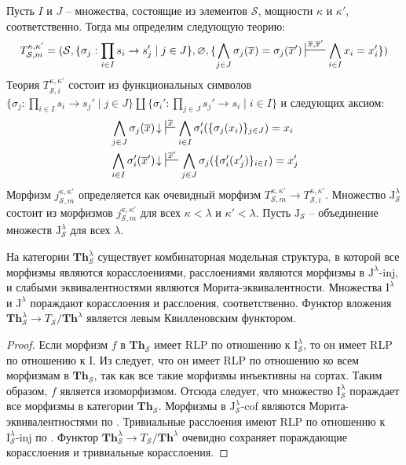 \documentclass[reqno]{amsart}
\theoremstyle{definition}
\theoremstyle{remark}
\newcommand{\bcat}[1]{\mathbf{#1}}
\newcommand{\Th}{\bcat{Th}}
\newcommand{\I}{\mathrm{I}}
\newcommand{\J}{\mathrm{J}}
\newcommand{\class}[2]{#1\text{-}\mathrm{#2}}
\newcommand{\Iinj}[1][\I]{\class{#1}{inj}}
\newcommand{\Icof}[1][\I]{\class{#1}{cof}}
\begin{document}
Пусть $I$ и $J$ -- множества, состоящие из элементов $\mathcal{S}$, мощности $\kappa$ и $\kappa'$, соответственно.
Тогда мы определим следующую теорию:
\[ T_{\mathcal{S},m}^{\kappa,\kappa'} = (\mathcal{S}, \{ \sigma_j : \prod_{i \in I} s_i \to s_j' \mid j \in J \}, \varnothing, \{ \bigwedge_{j \in J} \sigma_j(\overline{x}) = \sigma_j(\overline{x}') \sststile{}{\overline{x},\overline{x}'} \bigwedge_{i \in I} x_i = x_i' \}) \]
Теория $T_{\mathcal{S},i}^{\kappa,\kappa'}$ состоит из функциональных символов $\{ \sigma_j : \prod_{i \in I} s_i \to s_j' \mid j \in J \} \amalg \{ \sigma_i' : \prod_{j \in J} s_j' \to s_i \mid i \in I \}$ и следующих аксиом:
\begin{align*}
& \bigwedge_{j \in J} \sigma_j(\overline{x})\!\downarrow\ \sststile{}{\overline{x}} \bigwedge_{i \in I} \sigma_i'(\{ \sigma_j(x_i) \}_{j \in J}) = x_i \\
& \bigwedge_{i \in I} \sigma_i'(\overline{x}')\!\downarrow\ \sststile{}{\overline{x}'} \bigwedge_{j \in J} \sigma_j(\{ \sigma_i'(x_j') \}_{i \in I}) = x_j'
\end{align*}
Морфизм $j_{\mathcal{S},m}^{\kappa,\kappa'}$ определяется как очевидный морфизм $T_{\mathcal{S},m}^{\kappa,\kappa'} \to T_{\mathcal{S},i}^{\kappa,\kappa'}$.
Множество $\J_\mathcal{S}^\lambda$ состоит из морфизмов $j_{\mathcal{S},m}^{\kappa,\kappa'}$ для всех $\kappa < \lambda$ и $\kappa' < \lambda$.
Пусть $\J_\mathcal{S}$ -- объединение множеств $\J_\mathcal{S}^\lambda$ для всех $\lambda$.

\begin{prop}
На категории $\Th^\lambda_\mathcal{S}$ существует комбинаторная модельная структура, в которой все морфизмы являются корасслоениями, расслоениями являются морфизмы в $\Iinj[\J^\lambda]$, и слабыми эквивалентностями являются Морита-эквивалентности.
Множества $\I^\lambda$ и $\J^\lambda$ пораждают корасслоения и расслоения, соответственно.
Функтор вложения $\Th^\lambda_\mathcal{S} \to T_\mathcal{S}/\Th^\lambda$ является левым Квилленовским функтором.
\end{prop}
\begin{proof}
Если морфизм $f$ в $\Th_\mathcal{S}$ имеет RLP по отношению к $\I^\lambda_\mathcal{S}$, то он имеет RLP по отношению к $\I$.
Из  следует, что он имеет RLP по отношению ко всем морфизмам в $\Th_\mathcal{S}$, так как все такие морфизмы инъективны на сортах.
Таким образом, $f$ является изоморфизмом.
Отсюда следует, что множество $\I^\lambda_\mathcal{S}$ пораждает все морфизмы в категории $\Th_\mathcal{S}$.
Морфизмы в $\Icof[\J_\mathcal{S}^\lambda]$ являются Морита-эквивалентностями по .
Тривиальные расслоения имеют RLP по отношению к $\Iinj[\I_\mathcal{S}^\lambda]$ по .
Функтор $\Th^\lambda_\mathcal{S} \to T_\mathcal{S}/\Th^\lambda$ очевидно сохраняет пораждающие корасслоения и тривиальные корасслоения.
\end{proof}
\end{document}
